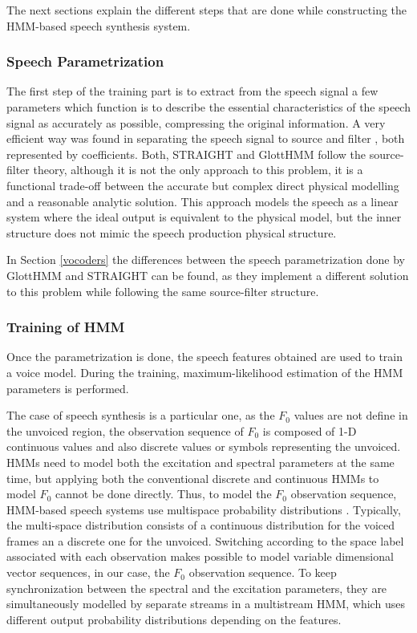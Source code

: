 The next sections explain the different steps that are done while constructing the HMM-based speech synthesis system.

\subsubsection{Speech Parametrization}
\label{hmm_synthesis_parametrization}
The first step of the training part is to extract from the speech signal a few parameters which function is to describe the essential characteristics of the speech signal as accurately as possible, compressing the original information.
%
A very efficient way was found in separating the speech signal to source and filter \cite{Fant1970}, both represented by coefficients. 
%
Both, STRAIGHT and GlottHMM follow the source-filter theory, although it is not the only approach to this problem, it is a functional trade-off between the accurate but complex direct physical modelling and a reasonable analytic solution.
%
This approach models the speech as a linear system where the ideal output is equivalent to the physical model, but the inner structure does not mimic the speech production physical structure.

In Section \ref{vocoders} the differences between the speech parametrization done by GlottHMM and STRAIGHT can be found, as they implement a different solution to this problem while following the same source-filter structure.

\subsubsection{Training of HMM}
\label{hmm_synthesis_training}
Once the parametrization is done, the speech features obtained are used to train a voice model. 
%
During the training, maximum-likelihood estimation of the HMM parameters is performed.

The case of speech synthesis is a particular one, as the $F_{0}$ values are not define in the unvoiced region, the observation sequence of $F_{0}$ is composed of 1-D continuous values and also discrete values or symbols representing the unvoiced.
%
HMMs need to model both the excitation and spectral parameters at the same time, but applying both the conventional discrete and continuous HMMs to model $F_{0}$ cannot be done directly. 
%
Thus, to model the $F_{0}$ observation sequence, HMM-based speech systems use multispace probability distributions \cite{tokuda2002multi}. 
%
Typically, the multi-space distribution consists of a continuous distribution for the voiced frames an a discrete one for the unvoiced. 
%
Switching according to the space label associated with each observation makes possible to model variable dimensional vector sequences, in our case, the $F_{0}$ observation sequence.
% 
To keep synchronization between the spectral and the excitation parameters, they are simultaneously modelled by separate streams in a multistream HMM, which uses different output probability distributions depending on the features.

